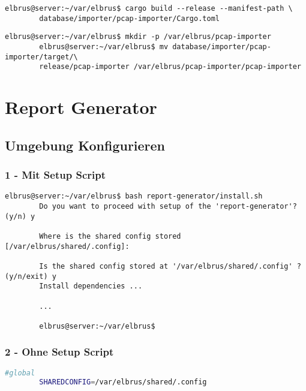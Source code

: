 \documentclass{article}
\begin{document}
	\begin{lstlisting}[caption={Kompilieren des 'pcap-importers'.}]
		elbrus@server:~/var/elbrus$ cargo build --release --manifest-path \
		database/importer/pcap-importer/Cargo.toml
	\end{lstlisting}

	\begin{lstlisting}[caption={Kopieren des 'pcap-importers' in ein eigenes Verzeichniss.}]
		elbrus@server:~/var/elbrus$ mkdir -p /var/elbrus/pcap-importer
		elbrus@server:~/var/elbrus$ mv database/importer/pcap-importer/target/\
		release/pcap-importer /var/elbrus/pcap-importer/pcap-importer
	\end{lstlisting}
	\newpage
	
	\section{Report Generator}

	\subsection[file config]{Umgebung Konfigurieren}
	
	\subsubsection{1 - Mit Setup Script}
	
	\begin{lstlisting}[caption={Ausführen des 'install.sh' Scripts.}]
		elbrus@server:~/var/elbrus$ bash report-generator/install.sh
		Do you want to proceed with setup of the 'report-generator'? (y/n) y
		
		Where is the shared config stored [/var/elbrus/shared/.config]:
		
		Is the shared config stored at '/var/elbrus/shared/.config' ? (y/n/exit) y
		Install dependencies ...
		
		...
		
		elbrus@server:~/var/elbrus$
	\end{lstlisting}

	\subsubsection{2 - Ohne Setup Script}
	\lstset{style=files}
	\begin{lstlisting}[caption={Anhand von '.env.example' eigene '.env' Datei anlegen.}, language=bash]
		#global
		SHAREDCONFIG=/var/elbrus/shared/.config
	\end{lstlisting}
		
\end{document}
